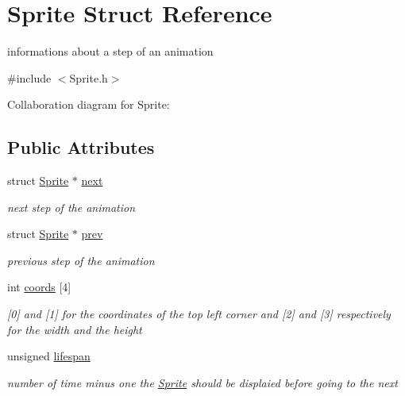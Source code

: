 \hypertarget{structSprite}{}\section{Sprite Struct Reference}
\label{structSprite}


informations about a step of an animation  




{\ttfamily \#include $<$Sprite.\+h$>$}



Collaboration diagram for Sprite\+:
\subsection*{Public Attributes}
\begin{DoxyCompactItemize}
\item 
struct \hyperlink{structSprite}{Sprite} $\ast$ \hyperlink{structSprite_a52b8df63621811a2835cd11ba69cebfb}{next}\hypertarget{structSprite_a52b8df63621811a2835cd11ba69cebfb}{}\label{structSprite_a52b8df63621811a2835cd11ba69cebfb}

\begin{DoxyCompactList}\small\item\em next step of the animation \end{DoxyCompactList}\item 
struct \hyperlink{structSprite}{Sprite} $\ast$ \hyperlink{structSprite_a2c09859f5f18f9d8272171eb43bf66e8}{prev}\hypertarget{structSprite_a2c09859f5f18f9d8272171eb43bf66e8}{}\label{structSprite_a2c09859f5f18f9d8272171eb43bf66e8}

\begin{DoxyCompactList}\small\item\em previous step of the animation \end{DoxyCompactList}\item 
int \hyperlink{structSprite_a63a82c9db293f2a0b9a043894cea93ce}{coords} \mbox{[}4\mbox{]}\hypertarget{structSprite_a63a82c9db293f2a0b9a043894cea93ce}{}\label{structSprite_a63a82c9db293f2a0b9a043894cea93ce}

\begin{DoxyCompactList}\small\item\em \mbox{[}0\mbox{]} and \mbox{[}1\mbox{]} for the coordinates of the top left corner and \mbox{[}2\mbox{]} and \mbox{[}3\mbox{]} respectively for the width and the height \end{DoxyCompactList}\item 
unsigned \hyperlink{structSprite_ac7deb2af6710a22bec013f2214fc0df7}{lifespan}\hypertarget{structSprite_ac7deb2af6710a22bec013f2214fc0df7}{}\label{structSprite_ac7deb2af6710a22bec013f2214fc0df7}

\begin{DoxyCompactList}\small\item\em number of time minus one the \hyperlink{structSprite}{Sprite} should be displaied before going to the next \end{DoxyCompactList}\end{DoxyCompactItemize}


